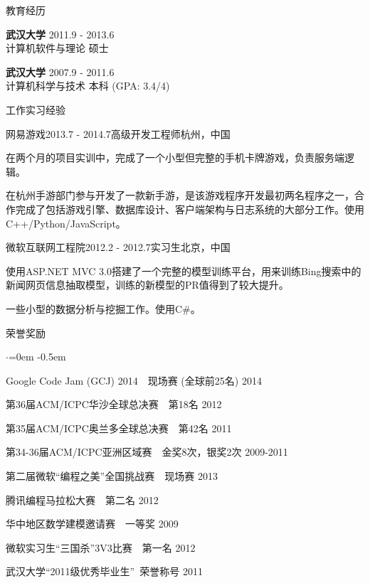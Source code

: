 \documentclass{resume} %
\begin{document}
\begin{rSection}{教育经历}

{\bf 武汉大学} \hfill {2011.9 - 2013.6} \\
计算机软件与理论 硕士

{\bf 武汉大学} \hfill {2007.9 - 2011.6} \\
计算机科学与技术 本科 (GPA: 3.4/4)
\vspace{0.5em}

\end{rSection}

\begin{rSection}{工作实习经验}

\begin{rSubsection}{网易游戏}{2013.7 - 2014.7}{高级开发工程师}{杭州，中国}
\item 在两个月的项目实训中，完成了一个小型但完整的手机卡牌游戏，负责服务端逻辑。
\item 在杭州手游部门参与开发了一款新手游，是该游戏程序开发最初两名程序之一，合作完成了包括游戏引擎、数据库设计、客户端架构与日志系统的大部分工作。使用C++/Python/JavaScript。
\end{rSubsection}
\begin{rSubsection}{微软互联网工程院}{2012.2 - 2012.7}{实习生}{北京，中国}
\item 使用ASP.NET MVC 3.0搭建了一个完整的模型训练平台，用来训练Bing搜索中的新闻网页信息抽取模型，训练的新模型的PR值得到了较大提升。
\item 一些小型的数据分析与挖掘工作。使用C\#。
\end{rSubsection}

\end{rSection}

\begin{rSection}{荣誉奖励}
\begin{list}{$\cdot$}{\leftmargin=0em}
\itemsep -0.5em \vspace{0em}
\item Google Code Jam (GCJ) 2014~~现场赛 (全球前25名)  \hfill {2014}
\item 第36届ACM/ICPC华沙全球总决赛~~第18名  \hfill {2012}
\item 第35届ACM/ICPC奥兰多全球总决赛~~第42名  \hfill {2011}
\item 第34-36届ACM/ICPC亚洲区域赛~~金奖8次，银奖2次 \hfill {2009-2011}
\item 第二届微软“编程之美”全国挑战赛~~现场赛 \hfill {2013}
\item 腾讯编程马拉松大赛~~第二名 \hfill {2012}
\item 华中地区数学建模邀请赛~~一等奖 \hfill {2009}
\item 微软实习生“三国杀”3V3比赛~~第一名 \hfill {2012}  %
\item 武汉大学“2011级优秀毕业生”\ 荣誉称号 \hfill {2011}
\end{list}
\vspace{0.5em}

\end{rSection}
\end{document}
